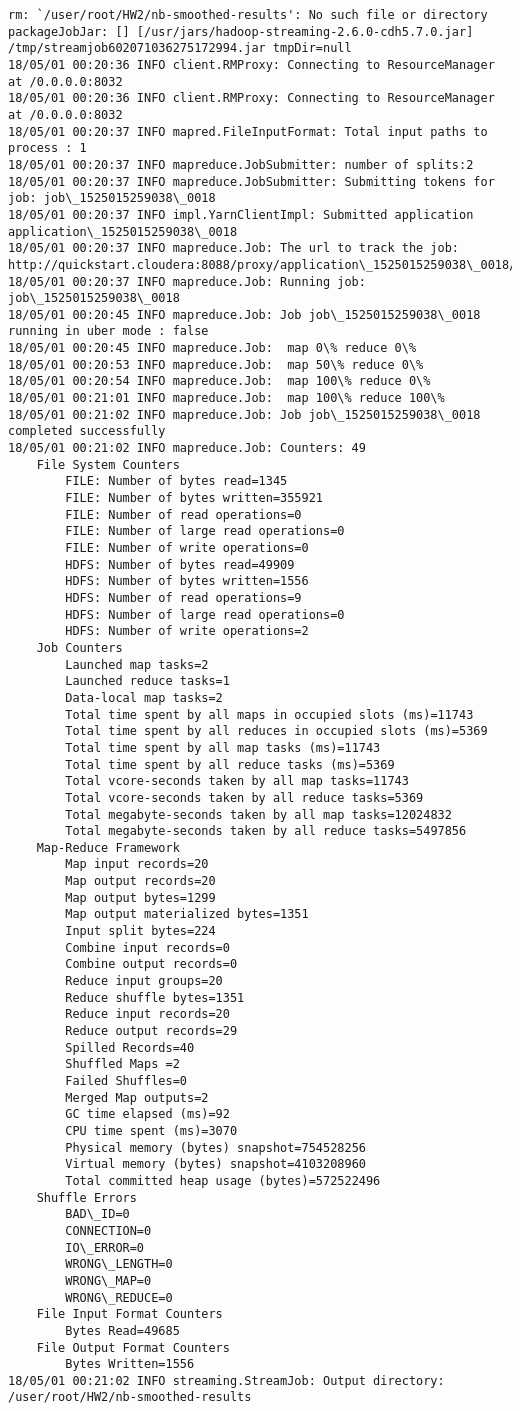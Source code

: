\documentclass[11pt]{article}
\begin{document}
    \begin{Verbatim}[commandchars=\\\{\}]
rm: `/user/root/HW2/nb-smoothed-results': No such file or directory
packageJobJar: [] [/usr/jars/hadoop-streaming-2.6.0-cdh5.7.0.jar] /tmp/streamjob602071036275172994.jar tmpDir=null
18/05/01 00:20:36 INFO client.RMProxy: Connecting to ResourceManager at /0.0.0.0:8032
18/05/01 00:20:36 INFO client.RMProxy: Connecting to ResourceManager at /0.0.0.0:8032
18/05/01 00:20:37 INFO mapred.FileInputFormat: Total input paths to process : 1
18/05/01 00:20:37 INFO mapreduce.JobSubmitter: number of splits:2
18/05/01 00:20:37 INFO mapreduce.JobSubmitter: Submitting tokens for job: job\_1525015259038\_0018
18/05/01 00:20:37 INFO impl.YarnClientImpl: Submitted application application\_1525015259038\_0018
18/05/01 00:20:37 INFO mapreduce.Job: The url to track the job: http://quickstart.cloudera:8088/proxy/application\_1525015259038\_0018/
18/05/01 00:20:37 INFO mapreduce.Job: Running job: job\_1525015259038\_0018
18/05/01 00:20:45 INFO mapreduce.Job: Job job\_1525015259038\_0018 running in uber mode : false
18/05/01 00:20:45 INFO mapreduce.Job:  map 0\% reduce 0\%
18/05/01 00:20:53 INFO mapreduce.Job:  map 50\% reduce 0\%
18/05/01 00:20:54 INFO mapreduce.Job:  map 100\% reduce 0\%
18/05/01 00:21:01 INFO mapreduce.Job:  map 100\% reduce 100\%
18/05/01 00:21:02 INFO mapreduce.Job: Job job\_1525015259038\_0018 completed successfully
18/05/01 00:21:02 INFO mapreduce.Job: Counters: 49
	File System Counters
		FILE: Number of bytes read=1345
		FILE: Number of bytes written=355921
		FILE: Number of read operations=0
		FILE: Number of large read operations=0
		FILE: Number of write operations=0
		HDFS: Number of bytes read=49909
		HDFS: Number of bytes written=1556
		HDFS: Number of read operations=9
		HDFS: Number of large read operations=0
		HDFS: Number of write operations=2
	Job Counters 
		Launched map tasks=2
		Launched reduce tasks=1
		Data-local map tasks=2
		Total time spent by all maps in occupied slots (ms)=11743
		Total time spent by all reduces in occupied slots (ms)=5369
		Total time spent by all map tasks (ms)=11743
		Total time spent by all reduce tasks (ms)=5369
		Total vcore-seconds taken by all map tasks=11743
		Total vcore-seconds taken by all reduce tasks=5369
		Total megabyte-seconds taken by all map tasks=12024832
		Total megabyte-seconds taken by all reduce tasks=5497856
	Map-Reduce Framework
		Map input records=20
		Map output records=20
		Map output bytes=1299
		Map output materialized bytes=1351
		Input split bytes=224
		Combine input records=0
		Combine output records=0
		Reduce input groups=20
		Reduce shuffle bytes=1351
		Reduce input records=20
		Reduce output records=29
		Spilled Records=40
		Shuffled Maps =2
		Failed Shuffles=0
		Merged Map outputs=2
		GC time elapsed (ms)=92
		CPU time spent (ms)=3070
		Physical memory (bytes) snapshot=754528256
		Virtual memory (bytes) snapshot=4103208960
		Total committed heap usage (bytes)=572522496
	Shuffle Errors
		BAD\_ID=0
		CONNECTION=0
		IO\_ERROR=0
		WRONG\_LENGTH=0
		WRONG\_MAP=0
		WRONG\_REDUCE=0
	File Input Format Counters 
		Bytes Read=49685
	File Output Format Counters 
		Bytes Written=1556
18/05/01 00:21:02 INFO streaming.StreamJob: Output directory: /user/root/HW2/nb-smoothed-results


\end{Verbatim}
\end{document}
